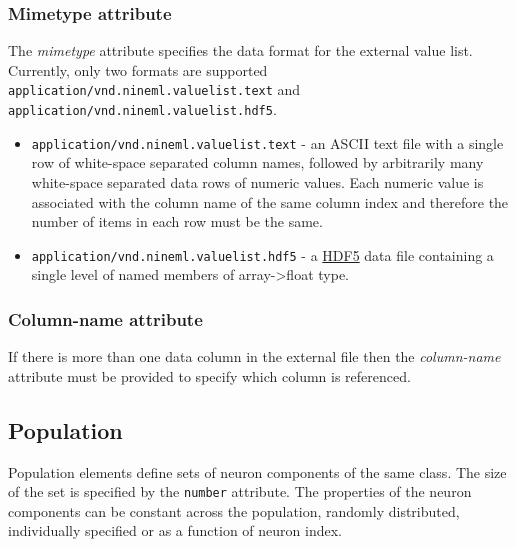 \documentclass[draftspec]{ninemlspec}
\begin{document}
\subsubsection{Mimetype attribute}
The \textit{mimetype} attribute specifies the data format for the external value list. Currently, only two formats are supported \lstinline|application/vnd.nineml.valuelist.text| and \lstinline|application/vnd.nineml.valuelist.hdf5|. 

\begin{itemize}
\item \lstinline|application/vnd.nineml.valuelist.text| - an ASCII text file with a single row of white-space separated column names, followed by arbitrarily many white-space separated data rows of numeric values. Each numeric value is associated with the column name of the same column index and therefore the number of items in each row must be the same.
\item \lstinline|application/vnd.nineml.valuelist.hdf5| - a \href{http://www.hdfgroup.org/HDF5/}{HDF5} data file containing a single level of named members of array->float type.
\end{itemize}
\tracingall

\subsubsection{Column-name attribute}
If there is more than one data column in the external file then the \textit{column-name} attribute must be provided to specify which column is referenced.

\subsection{Population}
\label{sec:Population}

Population elements define sets of neuron components of the same class. The size of the set is specified by the {\tt number} attribute. The properties of the neuron components can be constant across the population, randomly distributed, individually specified or as a function of neuron index.  
\end{document}
